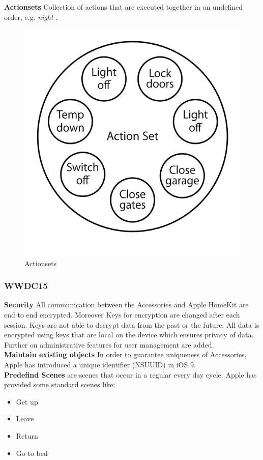 			\textbf{Actionsets} Collection of actions that are executed together in an undefined order, e.g. \textit{night} \parencite{IntroToHomeKit}.

			\begin{figure}[h]
				\centering
					\includegraphics[width=.5\textwidth]{images/theory/Actionsets.png}
				\caption{Actionsets \parencite{IntroToHomeKit}}
				\label{fig:Homekit_Database}
			\end{figure}

			\pagebreak

		\subsubsection{WWDC15}

			\textbf{Security} All communication between the Accessories and Apple HomeKit are end to end encrypted. Moreover Keys for encryption are changed after each session. Keys are not able to decrypt data from the past or the future. All data is encrypted using keys that are local on the device which ensures privacy of data. Further on administrative features for user management are added.\\

			\textbf{Maintain existing objects} In order to guarantee uniqueness of Accessories, Apple has introduced a unique identifier (NSUUID) in iOS 9.\\

			\textbf{Predefind Scenes} are scenes that occur in a regular every day cycle. Apple has provided some standard scenes like:

			\begin{itemize}
				\item Get up
				\item Leave
				\item Return
				\item Go to bed
			\end{itemize}

